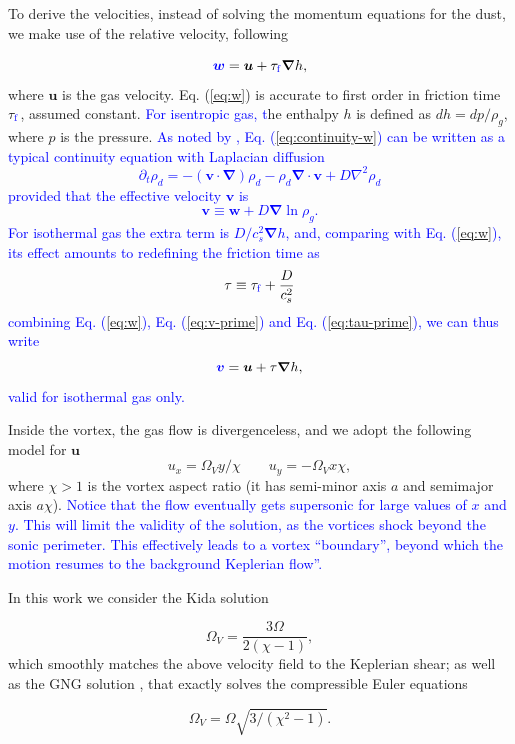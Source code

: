 \documentclass[apj]{emulateapj}
\renewcommand{\v}[1]{{\boldsymbol{#1}}} %
\def\blue#1{\textcolor{blue}{ #1}}
\newcommand{\del}{\v{\nabla}}
\newcommand{\grad}{\del}
\newcommand{\Div}{\del\cdot}
\newcommand{\Laplace}{\nabla^2}
\newcommand{\Eq}[1]{Eq. (\ref{#1})}
\newcommand{\eq}[1]{\Eq{#1}}
\newcommand{\beq}{\begin{equation}}
\newcommand{\eeq}{\end{equation}}
\newcommand{\tauf}{\tau_{\rm \blue{f}}}
\begin{document}
To derive the velocities, instead of solving the momentum equations
for the dust, we make use of the relative velocity, following
\citet[see also \citealt{Youdin08}]{Youdin-Goodman05}

\beq
\blue{\v{w}} = \v{u} + \tauf  \grad{h}, 
\label{eq:w}
\eeq
\noindent where $\v{u}$ is the gas velocity. \eq{eq:w} is 
accurate to first order in friction time $\tauf$, assumed 
constant. \blue{For isentropic gas, t}he enthalpy $h$ is defined as $dh = dp /\rho_g$, where $p$ 
is the pressure. \blue{As noted by
\cite{Charnoz11}, \eq{eq:continuity-w} can be written as a typical continuity equation with Laplacian diffusion 
\beq
\partial_t \rho_d = -(\v{v} \cdot\del)\rho_d - \rho_d \Div{\v{v}} + D\Laplace\rho_d \label{eq:continuity}
\eeq
\noindent provided that the effective velocity $\v{v}$ is 
\beq
\v{v} \equiv \v{w}  + D\grad\ln \rho_g\label{eq:v-prime}.
\eeq\noindent For isothermal gas the extra term is $D/c_s^2 \grad{h}$,
and, comparing with \eq{eq:w}, its effect amounts to redefining the
friction time as 
\beq
\tau \equiv \tauf + \frac{D}{c_s^2}\label{eq:tau-prime}
\eeq
\noindent combining \eq{eq:w}, \eq{eq:v-prime} and \eq{eq:tau-prime},
we can thus write
\beq
\blue{\v{v}} = \v{u} + \tau \grad{h}, \label{eq:v}
\eeq \noindent valid for isothermal gas only.}

Inside the vortex, the gas flow is divergenceless, and 
we adopt the following model for $\v{u}$
\beq
  u_x = \varOmega_V y / \chi \qquad  u_y= -\varOmega_V x \chi,
  \label{eq:vortex}
\eeq
\noindent where $\chi > 1$ is the vortex aspect ratio (it has
semi-minor axis $a$ and semimajor axis $a\chi$). \blue{Notice that the flow eventually
  gets supersonic for large values of $x$ and $y$. This will limit the
  validity of the solution, as the vortices shock beyond the sonic
  perimeter. This effectively leads to a vortex ``boundary'', beyond
  which the motion resumes to the background Keplerian flow''.} 

In this work we consider the Kida solution \citep{Kida81}

\beq
\varOmega_V = \frac{3\varOmega}{2(\chi-1)},  
\eeq
which smoothly matches the above velocity field to the Keplerian
shear; as well as the GNG solution \citep{Goodman87}, that exactly solves the 
compressible Euler equations 

\beq
\varOmega_V=\varOmega\sqrt{3/(\chi^2-1)}.
\eeq
\end{document}
